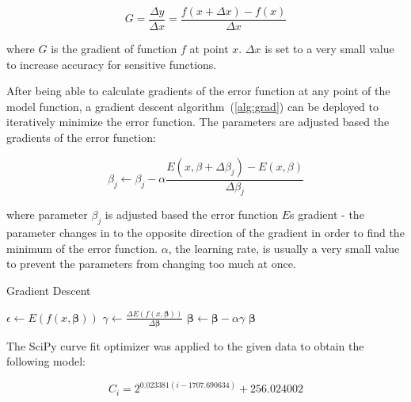 \documentclass{mcmthesis}
\begin{document}
    \begin{equation}
        G = \frac{\Delta y}{\Delta x} = \frac{f(x + \Delta x) - f(x)}{\Delta x}
        \label{eq:grad}
    \end{equation}

    \noindent where $G$ is the gradient of function $f$ at point $x$.
    $\Delta x$ is set to a very small value to increase accuracy for sensitive functions.

    After being able to calculate gradients of the error function at any point of the model function, a gradient descent algorithm~(\ref{alg:grad}) can be deployed to iteratively minimize the error function.
    The parameters are adjusted based the gradients of the error function:

    \begin{equation}
        \beta_j \longleftarrow \beta_j - \alpha \frac{E(x, \beta + \Delta \beta_j) - E(x, \beta)}{\Delta \beta_j}
    \end{equation}

    \noindent where parameter $\beta_j$ is adjusted based the error function $E$\textquotesingle s gradient - the parameter changes in to the opposite direction of the gradient in order to find the minimum of the error function.
    $\alpha$, the learning rate, is usually a very small value to prevent the parameters from changing too much at once.

    \begin{algorithm}
        \caption{Gradient Descent}
        \label{alg:grad}
        \begin{algorithmic}
            \Repeat
                \State $\epsilon \gets E(f(x, \mathbf{\beta}))$  
                \State $\gamma \gets \frac{\Delta E(f(x, \mathbf{\beta}))}{\Delta \mathbf{\beta}}$  
                \State $\mathbf{\beta} \gets \mathbf{\beta} - \alpha \gamma$  
            \State \Return $\mathbf{\beta}$ 
        \end{algorithmic}
    \end{algorithm}


    The SciPy curve fit optimizer was applied to the given data to obtain the following model:

    \begin{equation}
        C_i = 2^{0.023381 (i - 1707.690634)} + 256.024002
        \label{eq:co2_exp}
    \end{equation}
\end{document}
